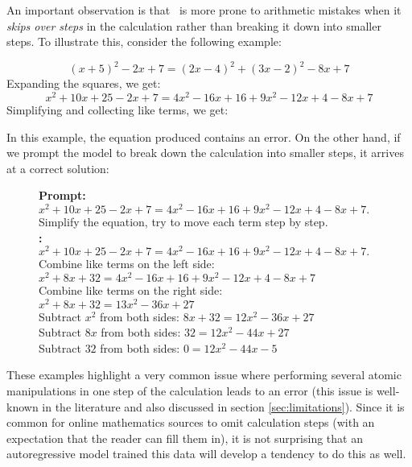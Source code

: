 An important observation is that  \DV \ is more prone to arithmetic mistakes when it \emph{skips over steps} in the calculation rather than breaking it down into smaller steps. To illustrate this, consider the following example:

\begin{AIbox}{\DV}\scriptsize
$$(x + 5)^2 - 2x + 7 = (2x - 4)^2 + (3x - 2)^2 - 8x + 7$$
Expanding the squares, we get:
$$x^2 + 10x + 25 - 2x + 7 = 4x^2 - 16x + 16 + 9x^2 - 12x + 4 - 8x + 7$$
Simplifying and collecting like terms, we get:
\end{AIbox}

In this example, the equation produced contains an error. On the other hand, if we prompt the model to break down the calculation into smaller steps, it arrives at a correct solution:
\begin{figure}[H]
\begin{AIbox}{\DV}
{\bf Prompt:} \\
{\scriptsize
$x^2 + 10x + 25 - 2x + 7 = 4x^2 - 16x + 16 + 9x^2 - 12x + 4 - 8x + 7.$\\
Simplify the equation, try to move each term step by step. 
}\\

{\bf \DV:} \\
{\scriptsize
$x^2 + 10x + 25 - 2x + 7 = 4x^2 - 16x + 16 + 9x^2 - 12x + 4 - 8x + 7.$\\
Combine like terms on the left side: $x^2 + 8x + 32 = 4x^2 - 16x + 16 + 9x^2 - 12x + 4 - 8x + 7$\\
Combine like terms on the right side: $x^2 + 8x + 32 = 13x^2 - 36x + 27$\\
Subtract $x^2$ from both sides: $8x + 32 = 12x^2 - 36x + 27$\\
Subtract $8x$ from both sides: $32 = 12x^2 - 44x + 27$\\
Subtract $32$ from both sides: $0 = 12x^2 - 44x - 5$\\
}
\end{AIbox}
\end{figure}

These examples highlight a very common issue where performing several atomic manipulations in one step of the calculation leads to an error (this issue is well-known in the literature and also discussed in section \ref{sec:limitations}). Since it is common for online mathematics sources to omit calculation steps (with an expectation that the reader can fill them in), it is not surprising that an autoregressive model trained this data will develop a tendency to do this as well.

